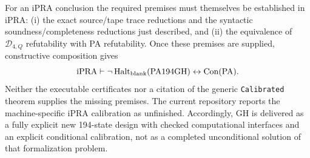 For an iPRA conclusion the required premises must themselves be established
in iPRA: (i) the exact source/tape trace reductions and the syntactic
soundness/completeness reductions just described, and (ii) the equivalence
of $\mathcal D_{4,Q}$ refutability with PA refutability. Once these premises
are supplied, constructive composition gives
\[
 \mathrm{iPRA}\vdash
 \neg\operatorname{Halt}_{\rm blank}(\mathrm{PA194GH})
       \leftrightarrow\operatorname{Con}(\mathrm{PA}).
\]
Neither the executable certificates nor a citation of the generic
\texttt{Calibrated} theorem supplies the missing premises. The current
repository reports the machine-specific iPRA calibration as unfinished.
Accordingly, GH is delivered as a fully explicit new 194-state design with
checked computational interfaces and an explicit conditional calibration,
not as a completed unconditional solution of that formalization problem.
